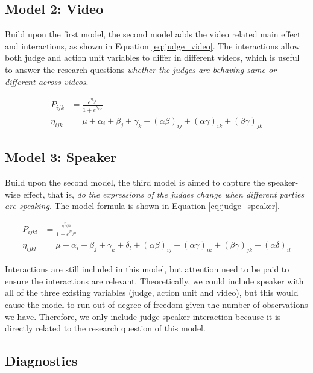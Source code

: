 \documentclass{monashthesis}
\begin{document}
\hypertarget{model-2-video}{%
\subsection{Model 2: Video}\label{model-2-video}}

Build upon the first model, the second model adds the video related main effect and interactions, as shown in Equation \ref{eq:judge_video}. The interactions allow both judge and action unit variables to differ in different videos, which is useful to answer the research questions \emph{whether the judges are behaving same or different across videos}.

\begin{align}\label{eq:judge_video}
P_{ijk} &= \frac{e^{\eta_{ijk}}}{1 + e^{\eta_{ijk}}} \\
\eta_{ijk} &= \mu + \alpha_i + \beta_j +\gamma_k + (\alpha\beta)_{ij} + (\alpha\gamma)_{ik} + (\beta\gamma)_{jk}
\end{align}

\noindent 

\hypertarget{model-3-speaker}{%
\subsection{Model 3: Speaker}\label{model-3-speaker}}

Build upon the second model, the third model is aimed to capture the speaker-wise effect, that is, \emph{do the expressions of the judges change when different parties are speaking}. The model formula is shown in Equation \ref{eq:judge_speaker}.

\begin{align}\label{eq:judge_speaker}
P_{ijkl} &= \frac{e^{\eta_{ijkl}}}{1 + e^{\eta_{ijkl}}} \\
\eta_{ijkl} &= \mu + \alpha_i + \beta_j +\gamma_k + \delta_l + (\alpha\beta)_{ij} + (\alpha\gamma)_{ik} + (\beta\gamma)_{jk} + (\alpha\delta)_{il}
\end{align}

Interactions are still included in this model, but attention need to be paid to ensure the interactions are relevant. Theoretically, we could include speaker with all of the three existing variables (judge, action unit and video), but this would cause the model to run out of degree of freedom given the number of observations we have. Therefore, we only include judge-speaker interaction because it is directly related to the research question of this model.

\hypertarget{diagnostics}{%
\subsection{Diagnostics}\label{diagnostics}}
\end{document}
